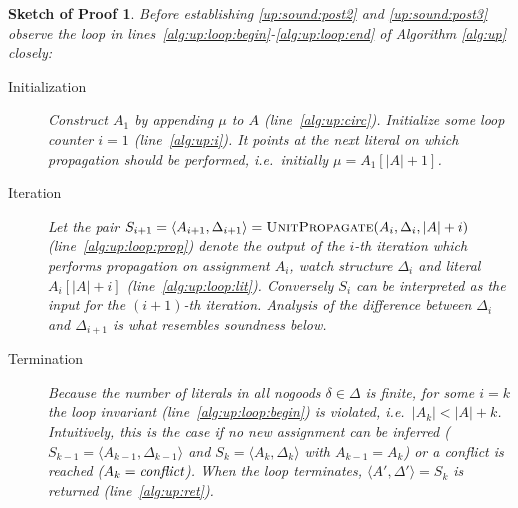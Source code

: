 \documentclass[final]{vutinfth} %
\newtheorem{proof-sketch}{Sketch of Proof}[chapter]
\newcommand{\ass}{A}
\newcommand{\dpm}{\Delta^\pm}
\newcommand{\sgl}{\mu}
\begin{document}
\begin{proof-sketch}


Before establishing \ref{up:sound:post2} and \ref{up:sound:post3} observe the loop in lines~\ref{alg:up:loop:begin}-\ref{alg:up:loop:end} of Algorithm \ref{alg:up} closely:
\begin{description}
\item[Initialization] Construct $A_1$ by appending $\sgl$ to $\ass$ (line~\ref{alg:up:circ}). Initialize some loop counter $i = 1$ (line~\ref{alg:up:i}). It points at the next literal on which propagation should be performed, i.e.~initially $\sgl = \ass_1[|\ass| + 1]$. 

\item[Iteration] Let the pair $S_{i+1} = \langle \ass_{i+1}, \Delta_{i+1} \rangle = \textsc{UnitPropagate}(\ass_i, \Delta_i, |A| + i)$ (line~\ref{alg:up:loop:prop}) denote the output of the $i$-th iteration which performs propagation on assignment $\ass_i$, watch structure $\Delta_i$ and literal $\ass_i[|A| + i]$ (line~\ref{alg:up:loop:lit}). Conversely $S_i$ can be interpreted as the input for the $(i+1)$-th iteration. Analysis of the difference between $\Delta_{i}$ and $\Delta_{i+1}$ is what resembles soundness below.

\item[Termination] Because the number of literals in all nogoods $\delta \in \Delta$ is finite, for some $i = k$ the loop invariant (line~\ref{alg:up:loop:begin}) is violated, i.e.~$|\ass_{k}| < |A| + k$. Intuitively, this is the case if no new assignment can be inferred ($S_{k-1} = \langle \ass_{k-1}, \Delta_{k-1} \rangle$ and $S_k = \langle \ass_k, \Delta_k \rangle$ with $\ass_{k-1} = \ass_k$) or a conflict is reached ($\ass_k = \emph{conflict}$). When the loop terminates, $\langle \ass', \Delta' \rangle = S_k$ is returned (line~\ref{alg:up:ret}).
\end{description}


\end{proof-sketch}
\end{document}
